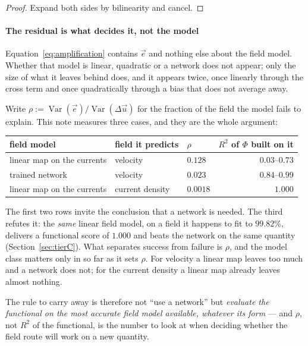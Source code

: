 \documentclass[11pt,a4paper]{article}
\theoremstyle{plain}
\theoremstyle{definition}
\theoremstyle{remark}
\begin{document}
\begin{proof}
Expand both sides by bilinearity and cancel.
\end{proof}

\label{rem:consequence}
\paragraph{The residual is what decides it, not the model}
Equation~\eqref{eq:amplification} contains $\vec{e}$ and nothing else about the
field model. Whether that model is linear, quadratic or a network does not
appear; only the size of what it leaves behind does, and it appears twice, once
linearly through the cross term and once quadratically through a bias that does
not average away.

Write $\rho := \operatorname{Var}(\vec{e})/\operatorname{Var}(\Delta\vec{u})$ for
the fraction of the field the model fails to explain. This note measures three
cases, and they are the whole argument:
\begin{center}
\small
\begin{tabular}{@{}lllr@{}}
\toprule
field model & field it predicts & $\rho$ & $R^2$ of $\Phi$ built on it \\
\midrule
linear map on the currents & velocity        & $0.128$  & $0.03$--$0.73$ \\
trained network            & velocity        & $0.023$  & $0.84$--$0.99$ \\
linear map on the currents & current density & $0.0018$ & $\mathbf{1.000}$ \\
\bottomrule
\end{tabular}
\end{center}

\noindent
The first two rows invite the conclusion that a network is needed. The third
refutes it: the \emph{same} linear field model, on a field it happens to fit to
$99.82\%$, delivers a functional score of $1.000$ and beats the network on the
same quantity (Section~\ref{sec:tierC}). What separates success from failure is
$\rho$, and the model class matters only in so far as it sets $\rho$. For
velocity a linear map leaves too much and a network does not; for the current
density a linear map already leaves almost nothing.

The rule to carry away is therefore not ``use a network'' but \emph{evaluate the
functional on the most accurate field model available, whatever its form} ---
and $\rho$, not $R^2$ of the functional, is the number to look at when deciding
whether the field route will work on a new quantity.
\end{document}
